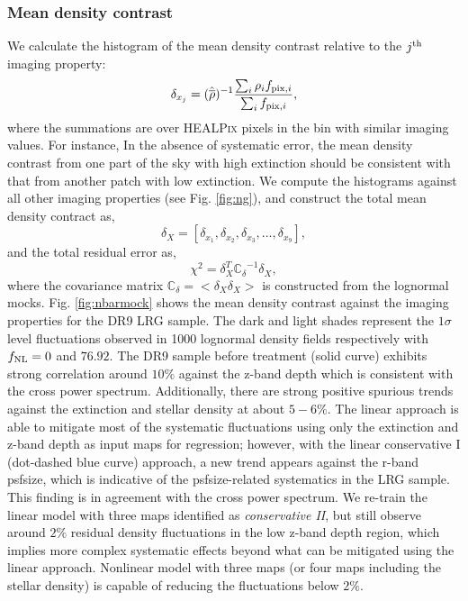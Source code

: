 \subsubsection{Mean density contrast}
We calculate the histogram of the mean density contrast relative to the $j^{\rm th}$ imaging property:
\begin{equation}
\delta_{x_{j}} = ({\hat{\overline{\rho}}})^{-1} \frac{\sum_{i} \rho_{i} f_{{\rm pix}, i}}{\sum_{i} f_{{\rm pix}, i}},
\end{equation}
where the summations are over \textsc{HEALPix} pixels in the bin with similar imaging values. For instance, In the absence of systematic error, the mean density contrast from one part of the sky with high extinction should be consistent with that from another patch with low extinction. We compute the histograms against all other imaging properties (see Fig. \ref{fig:ng}), and construct the total mean density contract as,
\begin{equation}
\delta_{X} = [\delta_{x_{1}}, \delta_{x_{2}}, \delta_{x_{3}}, ..., \delta_{x_{9}}],
\end{equation}
and the total residual error as,
\begin{equation}
\chi^{2} = \delta_{X}^{T} \mathbb{C_{\delta}}^{-1} \delta_{X},
\end{equation}
where the covariance matrix $\mathbb{C}_{\delta} = < \delta_{X} \delta_{X}>$ is constructed from the lognormal mocks. Fig. \ref{fig:nbarmock} shows the mean density contrast against the imaging properties for the DR9 LRG sample. The dark and light shades represent the $1\sigma$ level fluctuations observed in 1000 lognormal density fields respectively with $f_{\rm NL}=0$ and $76.92$. The DR9 sample before treatment (solid curve) exhibits strong correlation around $10\%$ against the z-band depth which is consistent with the cross power spectrum. Additionally, there are strong positive spurious trends against the extinction and stellar density at about $5-6\%$. The linear approach is able to mitigate most of the systematic fluctuations using only the extinction and z-band depth as input maps for regression; however, with the linear conservative I (dot-dashed blue curve) approach, a new trend appears against the r-band psfsize, which is indicative of the psfsize-related systematics in the LRG sample. This finding is in agreement with the cross power spectrum. We re-train the linear model with three maps identified as \textit{conservative II}, but still observe around $2\%$ residual density fluctuations in the low z-band depth region, which implies more complex systematic effects beyond what can be mitigated using the linear approach. Nonlinear model with three maps (or four maps including the stellar density) is capable of reducing the fluctuations below $2\%$. 


